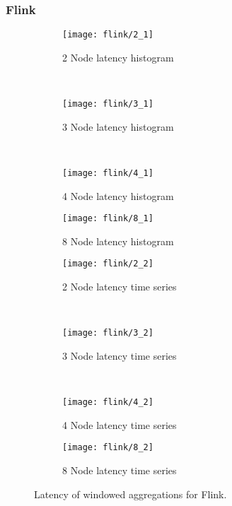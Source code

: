 \subsubsection{Flink}





\begin{figure*}
    \centering
    \begin{subfigure}[b]{0.49\textwidth}
        \texttt{[image: flink/2\_1]}
        \caption{2 Node latency histogram}
        \label{fig_no_queue}
    \end{subfigure}
    ~ %
    \begin{subfigure}[b]{0.49\textwidth}
        \texttt{[image: flink/3\_1]}
        \caption{3 Node latency histogram}
        \label{fig_yes_queue}
    \end{subfigure}
    ~ %
    \begin{subfigure}[b]{0.49\textwidth}
        \texttt{[image: flink/4\_1]}
        \caption{4 Node latency histogram}
        \label{fig_partial_queue}
    \end{subfigure}
        \begin{subfigure}[b]{0.49\textwidth}
        \texttt{[image: flink/8\_1]}
        \caption{8 Node latency histogram}
        \label{fig_partial_queue}
    \end{subfigure}


    \begin{subfigure}[b]{0.49\textwidth}
        \texttt{[image: flink/2\_2]}
        \caption{2 Node latency time series}
        \label{fig_no_queue}
    \end{subfigure}
    ~ %
    \begin{subfigure}[b]{0.49\textwidth}
        \texttt{[image: flink/3\_2]}
        \caption{3 Node latency time series}
        \label{fig_yes_queue}
    \end{subfigure}
    ~ %
    \begin{subfigure}[b]{0.49\textwidth}
        \texttt{[image: flink/4\_2]}
        \caption{4 Node latency time series}
        \label{fig_partial_queue}
    \end{subfigure}
        \begin{subfigure}[b]{0.49\textwidth}
        \texttt{[image: flink/8\_2]}
        \caption{8 Node latency time series}
        \label{fig_partial_queue}
    \end{subfigure}

    \label{fig_flink_agg_1}
        \caption{Latency of windowed aggregations for Flink.}
\end{figure*}


